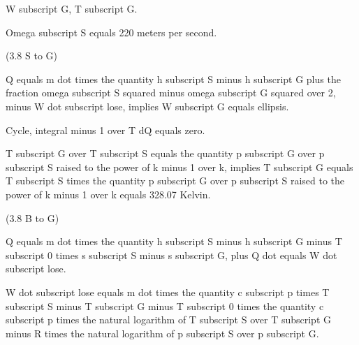 W subscript G, T subscript G.

Omega subscript S equals 220 meters per second.

(3.8 S to G)

Q equals m dot times the quantity h subscript S minus h subscript G plus the fraction omega subscript S squared minus omega subscript G squared over 2, minus W dot subscript lose, implies W subscript G equals ellipsis.

Cycle, integral minus 1 over T dQ equals zero.

T subscript G over T subscript S equals the quantity p subscript G over p subscript S raised to the power of k minus 1 over k, implies T subscript G equals T subscript S times the quantity p subscript G over p subscript S raised to the power of k minus 1 over k equals 328.07 Kelvin.

(3.8 B to G)

Q equals m dot times the quantity h subscript S minus h subscript G minus T subscript 0 times s subscript S minus s subscript G, plus Q dot equals W dot subscript lose.

W dot subscript lose equals m dot times the quantity c subscript p times T subscript S minus T subscript G minus T subscript 0 times the quantity c subscript p times the natural logarithm of T subscript S over T subscript G minus R times the natural logarithm of p subscript S over p subscript G.